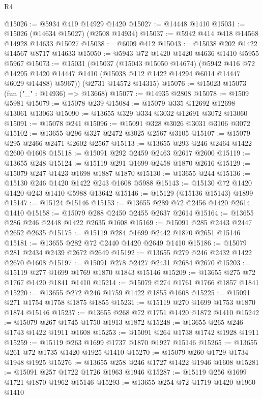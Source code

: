 \begin{lexlean}{R4}
\begin{coremodule}
@15026 := @5934 @419 @14929 @1420
@15027 := @14448 @1410
@15031 := @15026 (@14634 @15027) (@2508 @14934)
@15037 := @5942 @414 @418 @14568 @14928 @14633 @15027
@15038 := @6009 @412
@15043 := @15038 @202 @1422 @14567 @8717 @14633
@15050 := @5943 @72 @1420 @1420 @4636 @1410 @5955 @5967
@15073 := @15031
    (@15037
      (@15043 @15050 @14674)
      (@5942
        @416
        @72
        @14295
        @1420
        @14447
        @1410
        (@15038 @112 @1422 @14294 @6014 @14447 @6029 @14488)
        @5967))
    (@2731 @14572 @14315)
@15076 := @15023 @15073 (fun ("_" : @14936) => @13668)
@15077 := @14935 @2808
@15078 := @1509 @5981
@15079 := @15078 @239
@15084 := @15079 @335 @12692 @12698 @13061 @13063
@15090 := @13655 @329 @334 @3032 @12691 @3072 @13060
@15091 := @15078 @241
@15096 := @15091 @328 @3026 @3031 @3106 @3072
@15102 := @13655 @296 @327 @2472 @3025 @2567 @3105
@15107 := @15079 @295 @2466 @2471 @2602 @2567
@15113 := @13655 @293 @246 @2464 @1422 @2600 @1608
@15118 := @15091 @292 @2459 @2463 @2617 @2600
@15119 := @13655 @248
@15124 := @15119 @291 @1699 @2458 @1870 @2616
@15129 := @15079 @247 @1423 @1698 @1887 @1870
@15130 := @13655 @244
@15136 := @15130 @246 @1420 @1422 @243 @1608 @5988
@15143 := @15130 @72 @1420 @1420 @243 @1410 @5988 @13642
@15146 := @15129 (@15136 @15143) @1899
@15147 := @15124 @15146
@15153 := @13655 @289 @72 @2456 @1420 @2614 @1410
@15158 := @15079 @288 @2450 @2455 @2637 @2614
@15164 := @13655 @286 @246 @2448 @1422 @2635 @1608
@15169 := @15091 @285 @2443 @2447 @2652 @2635
@15175 := @15119 @284 @1699 @2442 @1870 @2651 @15146
@15181 := @13655 @282 @72 @2440 @1420 @2649 @1410
@15186 := @15079 @281 @2434 @2439 @2672 @2649
@15192 := @13655 @279 @246 @2432 @1422 @2670 @1608
@15197 := @15091 @278 @2427 @2431 @2684 @2670
@15203 := @15119 @277 @1699 @1769 @1870 @1843 @15146
@15209 := @13655 @275 @72 @1767 @1420 @1841 @1410
@15214 := @15079 @274 @1761 @1766 @1857 @1841
@15220 := @13655 @272 @246 @1759 @1422 @1855 @1608
@15225 := @15091 @271 @1754 @1758 @1875 @1855
@15231 := @15119 @270 @1699 @1753 @1870 @1874 @15146
@15237 := @13655 @268 @72 @1751 @1420 @1872 @1410
@15242 := @15079 @267 @1745 @1750 @1913 @1872
@15248 := @13655 @265 @246 @1743 @1422 @1911 @1608
@15253 := @15091 @264 @1738 @1742 @1928 @1911
@15259 := @15119 @263 @1699 @1737 @1870 @1927 @15146
@15265 := @13655 @261 @72 @1735 @1420 @1925 @1410
@15270 := @15079 @260 @1729 @1734 @1948 @1925
@15276 := @13655 @258 @246 @1727 @1422 @1946 @1608
@15281 := @15091 @257 @1722 @1726 @1963 @1946
@15287 := @15119 @256 @1699 @1721 @1870 @1962 @15146
@15293 := @13655 @254 @72 @1719 @1420 @1960 @1410

\end{coremodule}
\end{lexlean}
